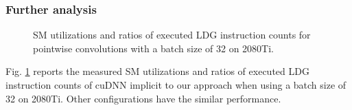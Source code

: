 \subsubsection{Further analysis}
\begin{figure}
    \centering
    \qquad

    \vspace{-2mm}
    \caption{SM utilizations and ratios of executed LDG instruction counts for pointwise convolutions with a batch size of 32 on 2080Ti.}
    \label{fig:pwinfo}
\end{figure}

Fig. \ref{fig:pwinfo} reports the measured SM utilizations and ratios of executed LDG instruction counts of cuDNN implicit to our approach when using a batch size of 32 on 2080Ti. Other configurations have the similar performance.

